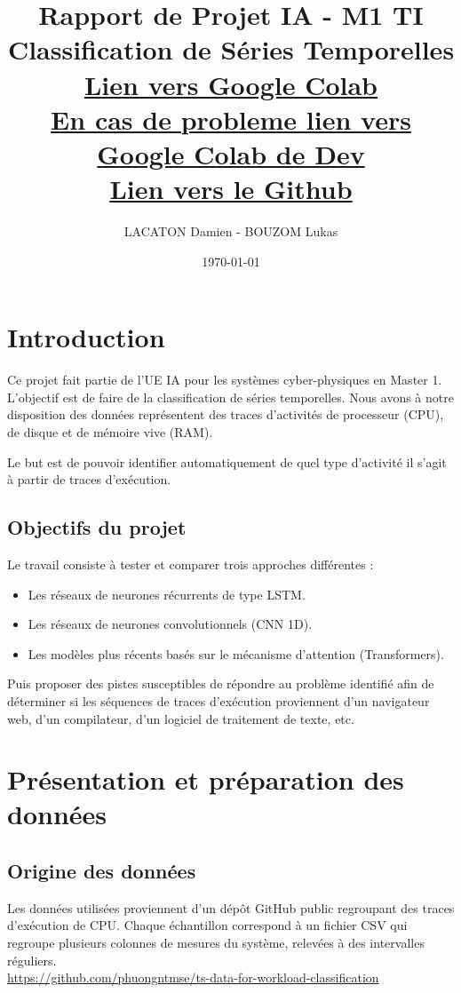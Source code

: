 \documentclass[12pt,a4paper]{report}
\title{Rapport de Projet IA - M1 TI \\ 
       Classification de Séries Temporelles \\[0.5em] 
       \large \href{https://colab.research.google.com/drive/1i6QlLAwTT1XtGUdHXpHcEQxaLgihG6oy?usp=sharing}{Lien vers Google Colab }\\[0.5em] 
       \large \href{https://colab.research.google.com/github/babycrashdev/m1_ia/blob/main/Projet_ia.ipynb?authuser=1#scrollTo=VQG3wyvkDg5H}{En cas de probleme lien vers Google Colab de Dev }\\[0.5em] 
       \large \href{https://github.com/babycrashdev/m1_ia}{Lien vers le Github}}
\author{LACATON Damien - BOUZOM Lukas}
\date{\today}
\begin{document}
\maketitle

\tableofcontents

\chapter{Introduction}

Ce projet fait partie de l'UE IA pour les systèmes cyber-physiques en Master 1. L'objectif est de faire de la classification de séries temporelles. Nous avons à notre disposition des données représentent des traces d'activités de processeur (CPU), de disque et de mémoire vive (RAM). 

Le but est de pouvoir identifier automatiquement de quel type d'activité il s'agit à partir de traces d'exécution.

\section{Objectifs du projet}
Le travail consiste à tester et comparer trois approches différentes :
\begin{itemize}
    \item Les réseaux de neurones récurrents de type LSTM.
    \item Les réseaux de neurones convolutionnels (CNN 1D).
    \item Les modèles plus récents basés sur le mécanisme d'attention (Transformers).
\end{itemize}

Puis proposer des pistes susceptibles de répondre au problème identifié afin de déterminer si les séquences de traces d’exécution proviennent d’un navigateur web, d’un compilateur, d’un logiciel de traitement de texte, etc.

\chapter{Présentation et préparation des données}

\section{Origine des données}
Les données utilisées proviennent d'un dépôt GitHub public regroupant des traces d'exécution de CPU. Chaque échantillon correspond à un fichier CSV qui regroupe plusieurs colonnes de mesures du système, relevées à des intervalles réguliers.\\
\url{https://github.com/phuongntmse/ts-data-for-workload-classification}
\end{document}
